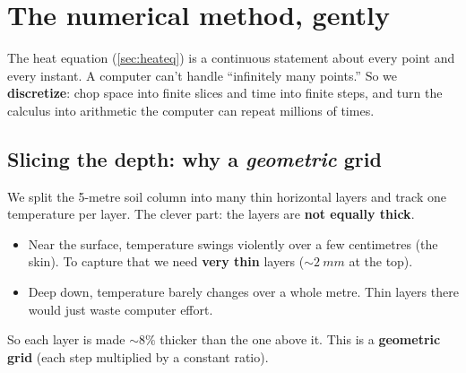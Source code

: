 \section{The numerical method, gently}
\label{sec:numerics}

The heat equation (\autoref{sec:heateq}) is a continuous statement about every
point and every instant. A computer can't handle ``infinitely many points.'' So
we \textbf{discretize}: chop space into finite slices and time into finite steps,
and turn the calculus into arithmetic the computer can repeat millions of times.

\subsection{Slicing the depth: why a \emph{geometric} grid}
\label{sec:grid}

We split the 5-metre soil column into many thin horizontal layers and track one
temperature per layer. The clever part: the layers are \textbf{not equally
thick}.
\begin{itemize}[leftmargin=1.4em,itemsep=3pt]
  \item Near the surface, temperature swings violently over a few centimetres
    (the skin). To capture that we need \textbf{very thin} layers
    (${\sim}\SI{2}{mm}$ at the top).
  \item Deep down, temperature barely changes over a whole metre. Thin layers
    there would just waste computer effort.
\end{itemize}
So each layer is made ${\sim}8\%$ thicker than the one above it. This is a
\textbf{geometric grid} (each step multiplied by a constant ratio).

